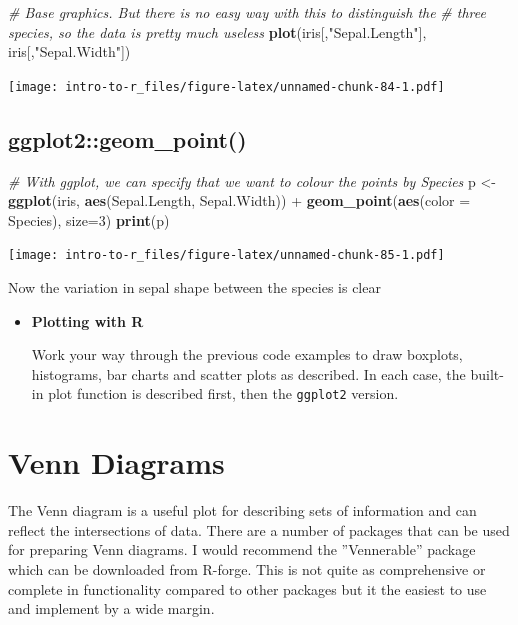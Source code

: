 \documentclass[a4paper]{book}
\newenvironment{Shaded}{\begin{snugshade}}{\end{snugshade}}
\newcommand{\KeywordTok}[1]{\textcolor[rgb]{0.13,0.29,0.53}{\textbf{{#1}}}}
\newcommand{\DataTypeTok}[1]{\textcolor[rgb]{0.13,0.29,0.53}{{#1}}}
\newcommand{\DecValTok}[1]{\textcolor[rgb]{0.00,0.00,0.81}{{#1}}}
\newcommand{\StringTok}[1]{\textcolor[rgb]{0.31,0.60,0.02}{{#1}}}
\newcommand{\CommentTok}[1]{\textcolor[rgb]{0.56,0.35,0.01}{\textit{{#1}}}}
\newcommand{\NormalTok}[1]{{#1}}
\renewenvironment{Shaded}
{\vspace{1.5em}\begin{leftbar}\begin{snugshade}}
{\end{snugshade}\end{leftbar}\vspace{3pt}}
\newenvironment{rmdblock}[1]
  {\vspace{1.5em}\begin{shaded*}
  \begin{itemize}
  \renewcommand{\labelitemi}{
    \raisebox{-.7\height}[0pt][0pt]{
      {\setkeys{Gin}{width=3em,keepaspectratio}\texttt{[image: images/\#1]}}
    }
  }
  \item
  }
  {
  \end{itemize}
  \end{shaded*}
  }
\newenvironment{rmdexercise}
  {\begin{rmdblock}{exercise}}
  {\end{rmdblock}}
\begin{document}
\begin{Shaded}
\begin{Highlighting}[]
\CommentTok{# Base graphics. But there is no easy way with this to distinguish the}
\CommentTok{# three species, so the data is pretty much useless}
\KeywordTok{plot}\NormalTok{(iris[,}\StringTok{"Sepal.Length"}\NormalTok{], iris[,}\StringTok{"Sepal.Width"}\NormalTok{])}
\end{Highlighting}
\end{Shaded}

\texttt{[image: intro-to-r\_files/figure-latex/unnamed-chunk-84-1.pdf]}

\subsection{ggplot2::geom\_point()}\label{ggplot2geom_point}

\begin{Shaded}
\begin{Highlighting}[]
\CommentTok{# With ggplot, we can specify that we want to colour the points by Species}
\NormalTok{p <-}\StringTok{ }\KeywordTok{ggplot}\NormalTok{(iris, }\KeywordTok{aes}\NormalTok{(Sepal.Length, Sepal.Width)) +}\StringTok{ }
\StringTok{  }\KeywordTok{geom_point}\NormalTok{(}\KeywordTok{aes}\NormalTok{(}\DataTypeTok{color =} \NormalTok{Species), }\DataTypeTok{size=}\DecValTok{3}\NormalTok{)}
\KeywordTok{print}\NormalTok{(p)}
\end{Highlighting}
\end{Shaded}

\texttt{[image: intro-to-r\_files/figure-latex/unnamed-chunk-85-1.pdf]}

Now the variation in sepal shape between the species is clear

\begin{rmdexercise}
\textbf{Plotting with R}

Work your way through the previous code examples to draw boxplots,
histograms, bar charts and scatter plots as described. In each case, the
built-in plot function is described first, then the \texttt{ggplot2}
version.
\end{rmdexercise}

\section{Venn Diagrams}\label{venn-diagrams}

The Venn diagram is a useful plot for describing sets of information and
can reflect the intersections of data. There are a number of packages
that can be used for preparing Venn diagrams. I would recommend the
''Vennerable'' package which can be downloaded from R-forge. This is not
quite as comprehensive or complete in functionality compared to other
packages but it the easiest to use and implement by a wide margin.
\end{document}

